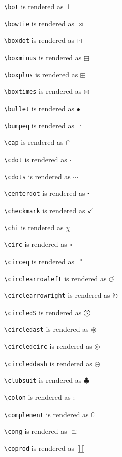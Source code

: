 \texttt{\textbackslash bot} is rendered as $\bot$

\texttt{\textbackslash bowtie} is rendered as $\bowtie$

\texttt{\textbackslash boxdot} is rendered as $\boxdot$

\texttt{\textbackslash boxminus} is rendered as $\boxminus$

\texttt{\textbackslash boxplus} is rendered as $\boxplus$

\texttt{\textbackslash boxtimes} is rendered as $\boxtimes$

\texttt{\textbackslash bullet} is rendered as $\bullet$

\texttt{\textbackslash bumpeq} is rendered as $\bumpeq$

\texttt{\textbackslash cap} is rendered as $\cap$

\texttt{\textbackslash cdot} is rendered as $\cdot$

\texttt{\textbackslash cdots} is rendered as $\cdots$

\texttt{\textbackslash centerdot} is rendered as $\centerdot$

\texttt{\textbackslash checkmark} is rendered as $\checkmark$

\texttt{\textbackslash chi} is rendered as $\chi$

\texttt{\textbackslash circ} is rendered as $\circ$

\texttt{\textbackslash circeq} is rendered as $\circeq$

\texttt{\textbackslash circlearrowleft} is rendered as $\circlearrowleft$

\texttt{\textbackslash circlearrowright} is rendered as $\circlearrowright$

\texttt{\textbackslash circledS} is rendered as $\circledS$

\texttt{\textbackslash circledast} is rendered as $\circledast$

\texttt{\textbackslash circledcirc} is rendered as $\circledcirc$

\texttt{\textbackslash circleddash} is rendered as $\circleddash$

\texttt{\textbackslash clubsuit} is rendered as $\clubsuit$

\texttt{\textbackslash colon} is rendered as $\colon$

\texttt{\textbackslash complement} is rendered as $\complement$

\texttt{\textbackslash cong} is rendered as $\cong$

\texttt{\textbackslash coprod} is rendered as $\coprod$

